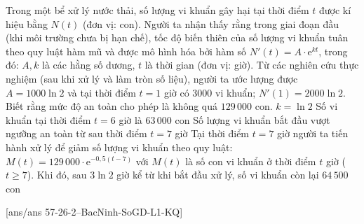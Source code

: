 \begin{ex}%
	Trong một bể xử lý nước thải, số lượng vi khuẩn gây hại tại thời điểm $t$ được kí hiệu bằng $N(t)$ (đơn vị: con). Người ta nhận thấy rằng trong giai đoạn đầu (khi môi trường chưa bị hạn chế), tốc độ biến thiên của số lượng vi khuẩn tuân theo quy luật hàm mũ và được mô hình hóa bởi hàm số $N'(t) = A \cdot \mathrm{e}^{kt}$, trong đó: $A, k$ là các hằng số dương, $t$ là thời gian (đơn vị: giờ). Từ các nghiên cứu thực nghiệm (sau khi xử lý và làm tròn số liệu), người ta ước lượng được $A = 1000\ln 2$ và tại thời điểm $t=1$ giờ có $3000$ vi khuẩn; $N'(1) = 2000 \ln 2$. Biết rằng mức độ an toàn cho phép là không quá $129\,000$ con.
	\choiceTF
	{\True $k = \ln 2$}
	{Số vi khuẩn tại thời điểm $t=6$ giờ là $63\,000$ con}
	{\True Số lượng vi khuẩn bắt đầu vượt ngưỡng an toàn từ sau thời điểm $t=7$ giờ}
	{Tại thời điểm $t=7$ giờ người ta tiến hành xử lý để giảm số lượng vi khuẩn theo quy luật: $M(t) = 129\,000 \cdot \mathrm{e}^{-0{,}5(t-7)}$ với $M(t)$ là số con vi khuẩn ở thời điểm $t$ giờ ($t \ge 7$). Khi đó, sau $3\ln 2$ giờ kể từ khi bắt đầu xử lý, số vi khuẩn còn lại $64\,500$ con}
\end{ex}
\caukq
{}[ans/ans 57-26-2--BacNinh-SoGD-L1-KQ]
